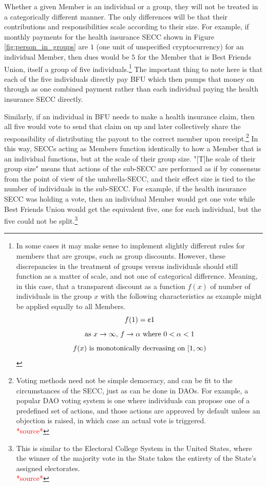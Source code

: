 \documentclass{article}[10pt]
\begin{document}
Whether a given Member is an individual or a group, they will not be treated in a categorically different manner. 
The only differences will be that their contributions and responsibilities scale according to their size.
For example, if monthly payments for the health insurance SECC shown in Figure \ref{fig:person_in_groups} are \textcent$1$ (one unit of unspecified cryptocurrency) for an individual Member, then dues would be \textcent$5$ for the Member that is Best Friends Union, itself a group of five individuals.\footnote{
    In some cases it may make sense to implement slightly different rules for members that are groups, such as group discounts. 
    However, these discrepancies in the treatment of groups versus individuals should still function as a matter of scale, and not one of categorical difference.
    Meaning, in this case, that a transparent discount as a function $f(x)$ of number of individuals in the group $x$ with the following characteristics as example might be applied equally to all Members.
    \[f(1) = \textnormal{\textcent} 1 \]  
    \[\textnormal{as } x \rightarrow \infty \textnormal{, } f \rightarrow \alpha \textnormal{ where } 0 < \alpha < 1\] 
    \[f(x) \textnormal{ is monotonically decreasing on }[1,\infty)\]}
The important thing to note here is that each of the five individuals directly pay BFU which then pumps that money on through as one combined payment rather than each individual paying the health insurance SECC directly. \par

Similarly, if an individual in BFU needs to make a health insurance claim, then all five would vote to send that claim on up and later collectively share the responsibility of distributing the payout to the correct member upon receipt.\footnote{ \label{note:groupDiscount}
    Voting methods need not be simple democracy, and can be fit to the circumstances of the SECC, just as can be done in DAOs.
    For example, a popular DAO voting system is one where individuals can propose one of a predefined set of actions, and those actions are approved by default unless an objection is raised, in which case an actual vote is triggered. \\
    \indent \indent \textcolor{red}{*source*}}
In this way, SECCs acting as Members function identically to how a Member that is an individual functions, but at the scale of their group size.
"[T]he scale of their group size" means that actions of the sub-SECC are performed as if by consensus from the point of view of the umbrella-SECC, and their effect size is tied to the number of individuals in the sub-SECC.
For example, if the health insurance SECC was holding a vote, then an individual Member would get one vote while Best Friends Union would get the equivalent five, one for each individual, but the five could not be split.\footnote{
    This is similar to the Electoral College System in the United States, where the winner of the majority vote in the State takes the entirety of the State's assigned electorates.\\
    \indent \indent \textcolor{red}{*source*}} \par
\end{document}
